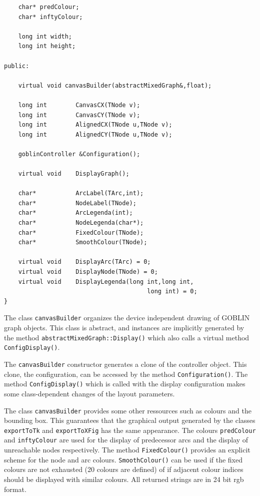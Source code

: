 \documentclass[a4paper,11pt,twoside]{book}
\begin{document}
\begin{multicols}{2}
\begin{mymethods}
\begin{verbatim}
    char* predColour;
    char* inftyColour;

    long int width;
    long int height;

public:

    virtual void canvasBuilder(abstractMixedGraph&,float);

    long int        CanvasCX(TNode v);
    long int        CanvasCY(TNode v);
    long int        AlignedCX(TNode u,TNode v);
    long int        AlignedCY(TNode u,TNode v);

    goblinController &Configuration();

    virtual void    DisplayGraph();

    char*           ArcLabel(TArc,int);
    char*           NodeLabel(TNode);
    char*           ArcLegenda(int);
    char*           NodeLegenda(char*);
    char*           FixedColour(TNode);
    char*           SmoothColour(TNode);

    virtual void    DisplayArc(TArc) = 0;
    virtual void    DisplayNode(TNode) = 0;
    virtual void    DisplayLegenda(long int,long int,
                                        long int) = 0;
}
\end{verbatim}
\end{mymethods}
The class \verb/canvasBuilder/ organizes the device independent drawing
of GOBLIN graph objects. This class is abstract, and instances are implicitly
generated by the method \verb/abstractMixedGraph::Display()/ which also calls
a virtual method \verb/ConfigDisplay()/.

The \verb/canvasBuilder/ constructor generates a clone of the controller
object. This clone, the configuration, can be accessed by the method
\verb/Configuration()/. The method \verb/ConfigDisplay()/ which is called with
the display configuration makes some class-dependent changes of the layout
parameters.

The class \verb/canvasBuilder/ provides some other ressources such as
colours and the bounding box. This guarantees that the graphical output
generated by the classes \verb/exportToTk/ and \verb/exportToXFig/ has the same
appearance. The colours \verb/predColour/ and \verb/inftyColour/ are used for
the display of predecessor arcs and the display of unreachable nodes
respectively. The method \verb/FixedColour()/ provides an explicit scheme for the
node and arc colours. \verb/SmoothColour()/ can be used if the fixed colours are
not exhausted (20 colours are defined) of if adjacent colour indices should
be displayed with similar colours. All returned strings are in 24 bit rgb format.


\end{multicols}
\end{document}
